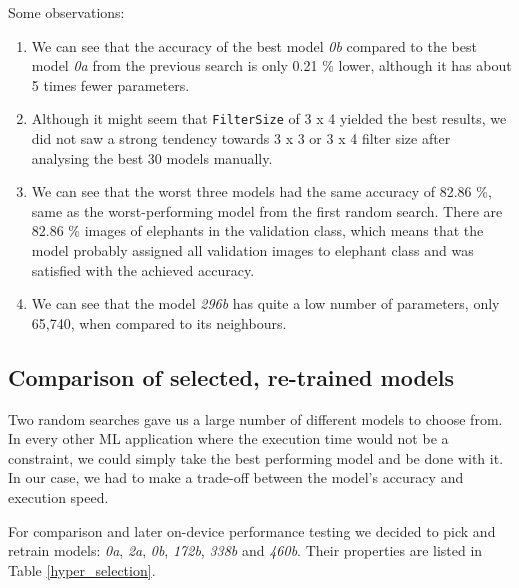 Some observations:
\begin{enumerate}
    \item We can see that the accuracy of the best model \textit{0b} compared to the best model \textit{0a} from the previous search is only 0.21 \% lower, although it has about 5 times fewer parameters.
    \item Although it might seem that \verb|FilterSize| of 3 x 4 yielded the best results, we did not saw a strong tendency towards 3 x 3 or 3 x 4 filter size after analysing the best 30 models manually.
    \item We can see that the worst three models had the same accuracy of 82.86 \%, same as the worst-performing model from the first random search. There are 82.86 \% images of elephants in the validation class, which means that the model probably assigned all validation images to elephant class and was satisfied with the achieved accuracy.
    \item We can see that the model \textit{296b} has quite a low number of parameters, only 65,740, when compared to its neighbours.
\end{enumerate}

\subsection{ Comparison of selected, re-trained models}
    
Two random searches gave us a large number of different models to choose from.
In every other ML application where the execution time would not be a constraint, we could simply take the best performing model and be done with it.
In our case, we had to make a trade-off between the model's accuracy and execution speed.

For comparison and later on-device performance testing we decided to pick and retrain models: \textit{0a}, \textit{2a}, \textit{0b}, \textit{172b}, \textit{338b} and \textit{460b}.
Their properties are listed in Table \ref{hyper_selection}.

